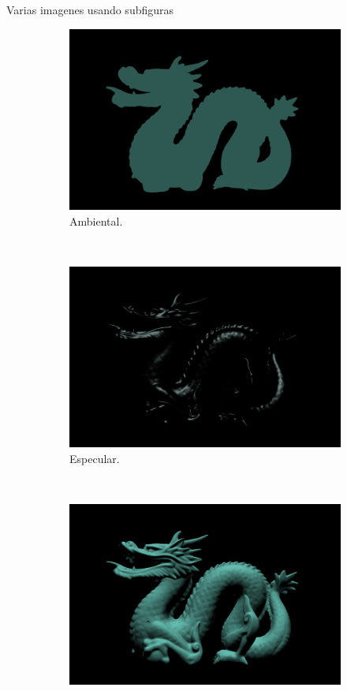\begin{frame}{Varias imagenes usando subfiguras}
\begin{figure}[htp]
 \centering
 \begin{subfigure}[b]{0.2\textwidth}
   \includegraphics[width=\textwidth]{img/ambiente}
   \caption{Ambiental.}
 \label{fig:2a}
 \end{subfigure}
~
 \begin{subfigure}[b]{0.2\textwidth}
   \includegraphics[width=\textwidth]{img/especular}
   \caption{Especular.}
   \label{fig:2b}
 \end{subfigure}
~
 \begin{subfigure}[b]{0.2\textwidth}
   \includegraphics[width=\textwidth]{img/difuso}

\end{subfigure}
\end{figure}
\end{frame}

